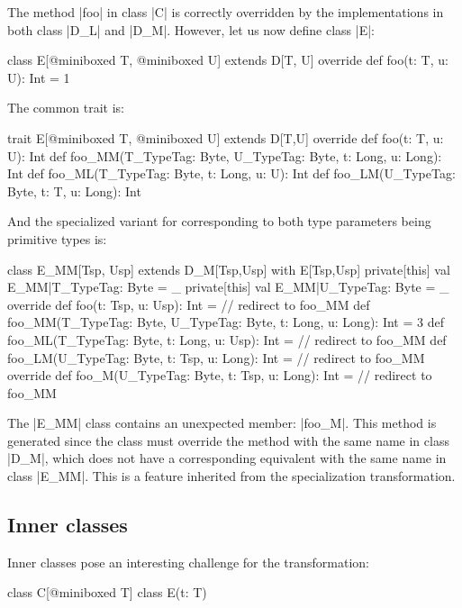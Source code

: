The method |foo| in class |C| is correctly overridden by the implementations in both class |D_L| and |D_M|.
However, let us now define class |E|:

\begin{lstlisting-nobreak}
class E[@miniboxed T, @miniboxed U] extends D[T, U] {
  override def foo(t: T, u: U): Int = 1
}
\end{lstlisting-nobreak}

The common trait is:

\begin{lstlisting-nobreak}
trait E[@miniboxed T, @miniboxed U] extends D[T,U] {
  override def foo(t: T, u: U): Int
  def foo_MM(T_TypeTag: Byte, U_TypeTag: Byte, t: Long, u: Long): Int
  def foo_ML(T_TypeTag: Byte, t: Long, u: U): Int
  def foo_LM(U_TypeTag: Byte, t: T, u: Long): Int
}
\end{lstlisting-nobreak}

And the specialized variant for corresponding to both type parameters being primitive types is:

\begin{lstlisting-nobreak}
class E_MM[Tsp, Usp] extends D_M[Tsp,Usp] with E[Tsp,Usp] {
  private[this] val E_MM|T_TypeTag: Byte = _
  private[this] val E_MM|U_TypeTag: Byte = _
  override def foo(t: Tsp, u: Usp): Int = // redirect to foo_MM
  def foo_MM(T_TypeTag: Byte, U_TypeTag: Byte, t: Long, u: Long): Int = 3
  def foo_ML(T_TypeTag: Byte, t: Long, u: Usp): Int = // redirect to foo_MM
  def foo_LM(U_TypeTag: Byte, t: Tsp, u: Long): Int = // redirect to foo_MM
  override def foo_M(U_TypeTag: Byte, t: Tsp, u: Long): Int = // redirect to foo_MM
}
\end{lstlisting-nobreak}

The |E_MM| class contains an unexpected member: |foo_M|. This method is generated since the class must override the method with the same name in class |D_M|, which does not have a corresponding equivalent with the same name in class |E_MM|. This is a feature inherited from the specialization transformation.

\subsection{Inner classes}

Inner classes pose an interesting challenge for the transformation:

\begin{lstlisting-nobreak}
class C[@miniboxed T] {
  class E(t: T)
}
\end{lstlisting-nobreak}

